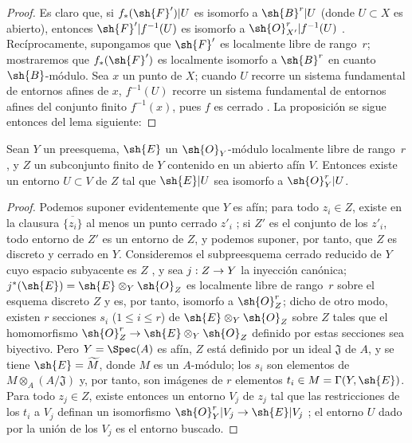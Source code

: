 \documentclass[oneside,10pt]{amsart}
\makeatletter
\renewcommand{\leq}{\leqslant}
\newcommand{\ega@arrow}[2]{\mathchoice{#1}{#2}{#2}{#2}}
\renewcommand{\to}{\ega@arrow{\longrightarrow}{\rightarrow}}
\newcommand{\oldpage}[2][]{\marginnote{\normalfont\footnotesize\textbf{#1}~|~#2}\ignorespaces}
\let\EGAOriginalLabel\label
\renewcommand{\label}[1]{\phantomsection\EGAOriginalLabel{#1}}
\makeatother
\begin{document}
\begin{proof}
Es claro que, si $f_*(\sh{F}')|U$ es isomorfo a $\sh{B}^r|U$ (donde $U\subset X$ es abierto), entonces $\sh{F}'|f^{-1}(U)$ es isomorfo a $\sh{O}_{X'}^r|f^{-1}(U)$ .
Recíprocamente, supongamos que $\sh{F}'$ es localmente libre de rango~$r$; mostraremos que $f_*(\sh{F}')$ es localmente isomorfo a $\sh{B}^r$ en cuanto $\sh{B}$-módulo.
Sea $x$ un punto de $X$;
cuando $U$ recorre un sistema fundamental de entornos afines de $x$, $f^{-1}(U)$ recorre un sistema fundamental de entornos afines  del conjunto finito $f^{-1}(x)$, pues $f$ es cerrado .
La proposición se sigue entonces del lema siguiente:
\end{proof}

\begin{lemma}[6.1.12.1]
\label{II.6.1.12.1}
Sean $Y$ un preesquema, $\sh{E}$ un $\sh{O}_Y$-módulo localmente libre de rango~$r$, y $Z$ un subconjunto finito de $Y$ contenido en un abierto afín $V$.
Entonces existe un entorno $U\subset V$ de $Z$ tal que $\sh{E}|U$ sea isomorfo a $\sh{O}_Y^r|U$.
\end{lemma}

\begin{proof}
Podemos suponer evidentemente que $Y$ es afín;
para todo $z_i\in Z$, existe en la clausura $\overline{\{z_i\}}$ al menos un punto cerrado $z'_i$ ;
si $Z'$ es el conjunto de los $z'_i$, todo entorno de $Z'$ es un entorno de $Z$, y podemos suponer, por tanto, que $Z$ es discreto y cerrado en $Y$.
Consideremos el subpreesquema cerrado reducido de $Y$ cuyo espacio subyacente es $Z$ , y sea $j:Z\to Y$ la inyección canónica;
$j^*(\sh{E})=\sh{E}\otimes_Y\sh{O}_Z$ es localmente libre de rango~$r$ sobre el esquema discreto $Z$ y es, por tanto, isomorfo a $\sh{O}_Z^r$;
dicho de otro modo, existen $r$ secciones $s_i$ ($1\leq i\leq r$) de $\sh{E}\otimes_Y\sh{O}_Z$ sobre $Z$ tales que el homomorfismo $\sh{O}_Z^r\to\sh{E}\otimes_Y\sh{O}_Z$ definido por estas secciones sea biyectivo.
Pero $Y=\Spec(A)$ es afín, $Z$ está definido por un ideal $\mathfrak{J}$ de $A$, y se tiene $\sh{E}=\widetilde{M}$, donde $M$ es un $A$-módulo;
los $s_i$ son elementos de $M\otimes_A(A/\mathfrak{J})$ y, por tanto, son imágenes de $r$ elementos $t_i\in M=\Gamma(Y,\sh{E})$.
\oldpage[II]{114}
Para todo $z_j\in Z$, existe entonces un entorno $V_j$ de $z_j$ tal que las restricciones de los $t_i$ a $V_j$ definan un isomorfismo $\sh{O}_Y^r|V_j\to\sh{E}|V_j$ ;
el entorno $U$ dado por la unión de los $V_j$ es el entorno buscado.
\end{proof}
\end{document}
